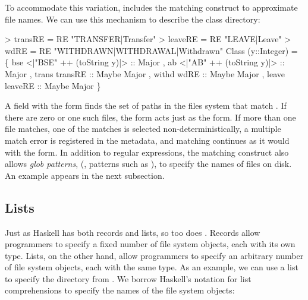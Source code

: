 To accommodate this variation, \forest{} includes the matching
construct to approximate file names.  We can use this mechanism to
describe the class directory:
\begin{code}
> transRE = RE "TRANSFER|Transfer"
> leaveRE = RE "LEAVE|Leave"
> wdRE    = RE "WITHDRAWN|WITHDRAWAL|Withdrawn"
\mbox{}
 Class (y::Integer) = 
  \{ bse  <|"BSE" ++ (toString y)|> :: Major
  , ab   <|"AB"  ++ (toString y)|> :: Major   
  , trans  transRE :: Maybe Major      
  , withd  wdRE    :: Maybe Major
  , leave  leaveRE :: Maybe Major \}
\end{code}
A field with the form 
finds the set of paths in the files system that match  .
If there are zero or one such files, the  form acts just as the  
form.  If more than one file matches, one of the matches
is selected non-deterministically, a multiple match error is
registered in the metadata, and matching continues as it would with
the  form.  In addition to regular expressions, the matching
construct also allows \textit{glob patterns}, (\ie{}, patterns such as 
),  to specify the names of files on disk. An example appears
in the next subsection. 


\subsection{Lists}
\label{sec:comprehensions}

%
Just as Haskell has both records and lists, so too does \forest{}.
Records allow programmers to specify a fixed number of file
system objects, each with its own type.  Lists, on the
other hand, allow programmers to specify an arbitrary number of file
system objects, each with the same type.  As an example, we can use a
list to specify the  directory from
.  We borrow Haskell's notation for list
comprehensions to specify the names of the file system objects:

